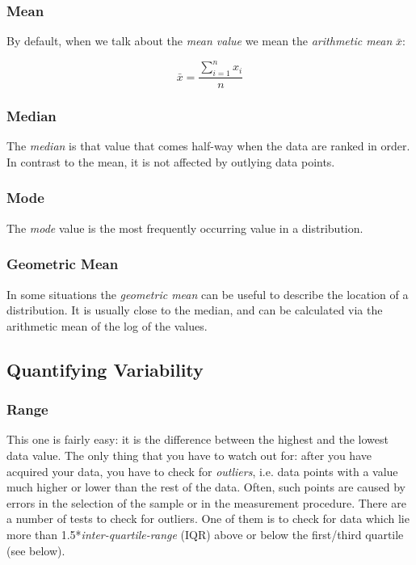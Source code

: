 \subsubsection{Mean} 
By default, when we talk about the \emph{mean value} we mean the \emph{arithmetic mean} $\bar{x}$:

\begin{equation}
  \bar{x} = \frac{{\sum\limits_{i = 1}^n {{x_i}} }}{n}
\end{equation}

\subsubsection{Median} 
The \emph{median} is that value that comes half-way when the data are ranked in order.
In contrast to the mean, it is not affected by outlying data points.

\subsubsection{Mode} 
The \emph{mode} value is the most frequently occurring value in a distribution.

\subsubsection{Geometric Mean}
In some situations the \emph{geometric mean} can be useful to describe the location of a distribution. It is usually close to the median, and can be calculated via the arithmetic mean of the log of the values.

\subsection{Quantifying Variability}\label{sec:centiles}

\subsubsection{Range}
This one is fairly easy: it is the difference between the highest and the lowest data value.
The only thing that you have to watch out for: after you have acquired your data, you have to check for \emph{outliers}, i.e. data points with a value much higher or lower than the rest of the data. Often, such points are caused by errors in the selection of the sample or in the measurement procedure. There are a number of tests to check for outliers. One of them is to check for data which lie more than 1.5*\emph{inter-quartile-range} (IQR) above or below the first/third quartile (see below).


